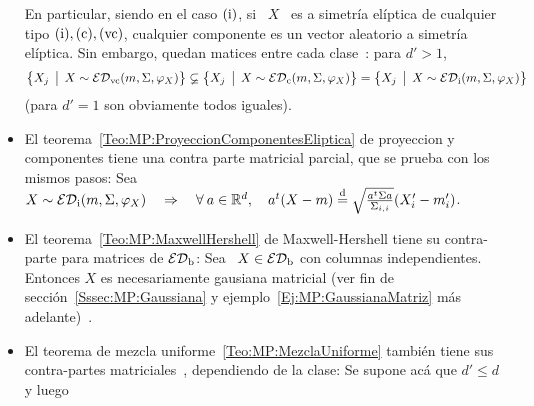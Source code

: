 \begin{itemize}
  En  particular, siendo  en  el  caso $(\mathrm{i})$,  si  \ $X$  \  es a  simetr\'ia
  el\'iptica de  cualquier tipo $(\mathrm{i}), (\mathrm{c}),  (\mathrm{vc})$, cualquier componente
  es un  vector aleatorio a  simetr\'ia el\'iptica. Sin embargo,  quedan matices
  entre cada clase~\cite[\S~3.2 \& Teo.~4]{FanChe84}: para $d' > 1$,
  \[
  \left\{  X_j   \:\: \big| \:\:  X  \sim   \mathcal{ED}_{\mathrm{vc}}(m  ,  \Sigma  ,   \varphi_X)  \right\}
  \varsubsetneq \left\{ X_j \:\: \big| \:\: X \sim \mathcal{ED}_{\mathrm{c}}(m , \Sigma , \varphi_X) \right\}
  = \left\{ X_j \:\: \big| \:\: X \sim \mathcal{ED}_{\mathrm{i}}(m , \Sigma , \varphi_X) \right\}
  \]
  (para $d' = 1$ son obviamente todos iguales).
%
\item  El  teorema~\ref{Teo:MP:ProyeccionComponentesEliptica}  de  proyeccion  y
  componentes tiene  una contra parte matricial  parcial, que se  prueba con los
  mismos  pasos: Sea  \ $X  \sim \mathcal{ED}_{\mathrm{i}}(m,\Sigma,\varphi_X)  \quad \Rightarrow
  \quad  \forall \:  a \in  \mathbb{R}^d, \quad  a^t (X  - m)  \stackrel{\mathrm{d}}{=} \sqrt{\frac{a^t
      \Sigma a}{\Sigma_{i,i}}} (X'_i -  m'_i)$.  
\item  El  teorema~\ref{Teo:MP:MaxwellHershell}  de  Maxwell-Hershell  tiene  su
  contra-parte para matrices de $\mathcal{ED}_{\mathrm{b}}$:  Sea \ $X \in \mathcal{ED}_{\mathrm{b}}$ con columnas
  independientes. Entonces $X$ es  necesariamente gausiana matricial (ver fin de
  secci\'on~\ref{Sssec:MP:Gaussiana} y ejemplo~\ref{Ej:MP:GaussianaMatriz} m\'as
  adelante)~\cite[Teo.~8]{FanChe84}.
%
\item El teorema  de mezcla uniforme~\ref{Teo:MP:MezclaUniforme} tambi\'en tiene
  sus contra-partes  matriciales~\cite[Teo.~1 \& Lema.~9]{FanChe84}, dependiendo
  de la clase: Se supone ac\'a que $d' \le d$ y luego
\end{itemize}
